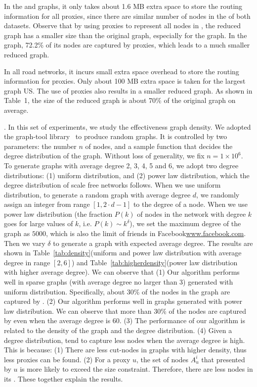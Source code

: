 In the \dblp and \dblpone graphs, it only takes about 1.6 MB extra space to store the routing information for all proxies, since there are similar number of nodes in the \dras of both datasets. Observe that by using proxies to represent all nodes in \dras, the reduced graph  has a smaller size than the original graph, especially for the \dblpone graph. In the \dblpone graph, 72.2\% of its nodes are captured by proxies, which leads to a much smaller reduced graph.

In all road networks, it incurs small extra space overhead to store the routing information for proxies. Only about 100 MB extra space is taken for the largest graph US. The use of proxies also results in a smaller reduced graph. As shown in Table~1, the size of the reduced graph is about 70\% of the original graph on average.


.
In this set of experiments, we study the effectiveness \wrt graph density. We adopted the graph-tool library~\cite{peixoto_graph-tool_2014} to produce random graphs. It is controlled by two parameters: the number $n$ of nodes, and a sample function that decides the degree distribution of the graph. Without loss of generality, we fix $n=1\times 10^6$. To generate graphs with average degree 2, 3, 4, 5 and 6, we adopt two degree distributions: (1) uniform distribution, and (2) power law distribution, which the degree distribution of scale free networks follows. When we use uniform distribution, to generate a random graph with average degree $d$, we randomly assign an integer from range $[1, 2\cdot d-1]$ to the degree of a node. When we use power law distribution (the fraction $P(k)$ of nodes in the network with degree $k$ goes for large values of $k$, i.e. $P(k)\sim k^\delta$), we set the maximum degree of the graph as $5000$, which is also the limit of friends in Facebook\url{www.facebook.com}. Then we vary $\delta$ to generate a graph with expected average degree. The results are shown in Table~\ref{tab:density}(uniform and power law distribution with average degree in range $[2,6]$) and Table~\ref{tab:higherdensity}(power law distribution with higher average degree). We can observe that (1) Our algorithm performs well in sparse graphs (with average degree no larger than 3) generated with uniform distribution. Specifically, about 30\% of the nodes in the graph are captured by \dras. (2) Our algorithm performs well in graphs generated with power law distribution. We can observe that more than 30\% of the nodes are captured by \dras even when the average degree is 60. (3) The performance of our algorithm is related to the density of the graph and the degree distribution. (4) Given a degree distribution, \dras tend to capture less nodes when the average degree is high. This is because: (1) There are less cut-nodes in graphs with higher density, thus less proxies can be found. (2) For a proxy $u$, the set of nodes $A_u^i$ that presented by $u$ is more likely to exceed the size constraint. Therefore, there are less nodes in its \dra. These together explain the results.


